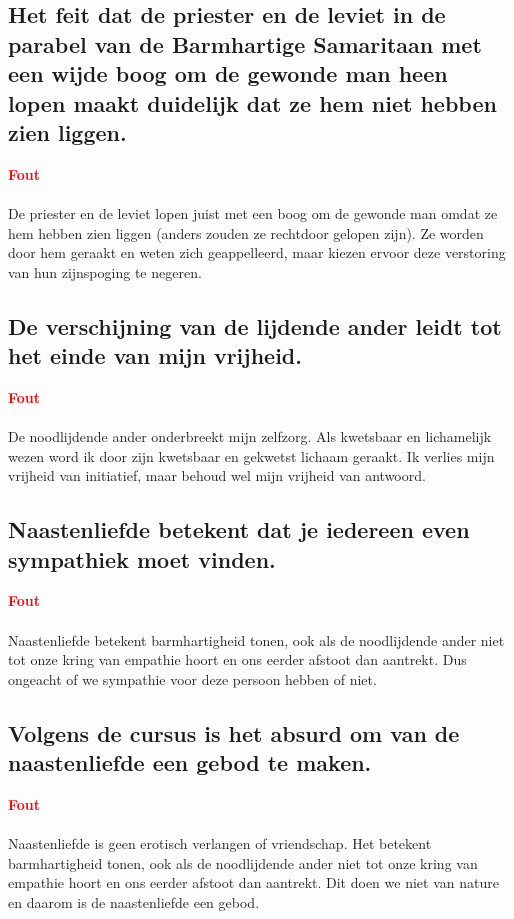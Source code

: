 \documentclass[11pt,a4paper,titlepage]{article}
\begin{document}
\subsection{Het feit dat de priester en de leviet in de parabel van de Barmhartige Samaritaan met een wijde boog om de gewonde man heen lopen maakt duidelijk dat ze hem niet hebben zien liggen.}
\textcolor{red}{\textbf{Fout}}\\\\
De priester en de leviet lopen juist met een boog om de gewonde man omdat ze hem hebben zien liggen (anders zouden ze rechtdoor gelopen zijn). Ze worden door hem geraakt en weten zich geappelleerd, maar kiezen ervoor deze verstoring van hun zijnspoging te negeren.

\subsection{De verschijning van de lijdende ander leidt tot het einde van mijn vrijheid.}
\textcolor{red}{\textbf{Fout}}\\\\
De noodlijdende ander onderbreekt mijn zelfzorg. Als kwetsbaar en lichamelijk wezen word ik door zijn kwetsbaar en gekwetst lichaam geraakt. Ik verlies mijn
vrijheid van initiatief, maar behoud wel mijn vrijheid van antwoord.

\subsection{Naastenliefde betekent dat je iedereen even sympathiek moet vinden.}
\textcolor{red}{\textbf{Fout}}\\\\
Naastenliefde betekent barmhartigheid tonen, ook als de noodlijdende ander niet tot onze kring van empathie hoort en ons eerder afstoot dan aantrekt. Dus ongeacht of we sympathie voor deze persoon hebben of niet.

\subsection{Volgens de cursus is het absurd om van de naastenliefde een gebod te maken.}
\textcolor{red}{\textbf{Fout}}\\\\
Naastenliefde is geen erotisch verlangen of vriendschap. Het betekent barmhartigheid tonen, ook als de noodlijdende ander niet tot onze kring van empathie hoort en ons eerder afstoot dan aantrekt. Dit doen we niet van nature en daarom is de naastenliefde een gebod.
\end{document}
